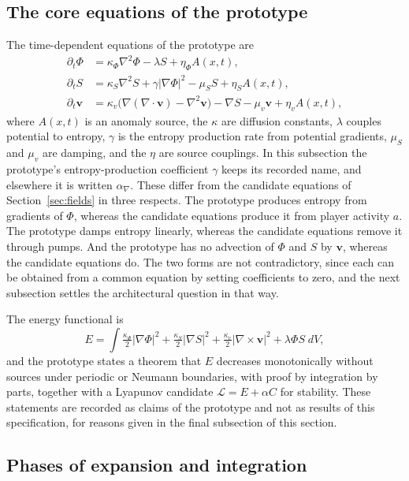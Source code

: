 \documentclass[11pt]{article}
\begin{document}
\subsection{The core equations of the prototype}

The time-dependent equations of the prototype are
\begin{align*}
\partial_t \Phi &= \kappa_\Phi \nabla^2 \Phi - \lambda S + \eta_\Phi A(x,t),\\
\partial_t S &= \kappa_S \nabla^2 S + \gamma |\nabla\Phi|^2 - \mu_S S + \eta_S A(x,t),\\
\partial_t \mathbf{v} &= \kappa_v\big(\nabla(\nabla\!\cdot\mathbf{v}) - \nabla^2\mathbf{v}\big) - \nabla S - \mu_v \mathbf{v} + \eta_v A(x,t),
\end{align*}
where $A(x,t)$ is an anomaly source, the $\kappa$ are diffusion constants, $\lambda$ couples potential to entropy, $\gamma$ is the entropy production rate from potential gradients, $\mu_S$ and $\mu_v$ are damping, and the $\eta$ are source couplings. In this subsection the prototype's entropy-production coefficient $\gamma$ keeps its recorded name, and elsewhere it is written $\alpha_\nabla$. These differ from the candidate equations of Section~\ref{sec:fields} in three respects. The prototype produces entropy from gradients of $\Phi$, whereas the candidate equations produce it from player activity $a$. The prototype damps entropy linearly, whereas the candidate equations remove it through pumps. And the prototype has no advection of $\Phi$ and $S$ by $\mathbf{v}$, whereas the candidate equations do. The two forms are not contradictory, since each can be obtained from a common equation by setting coefficients to zero, and the next subsection settles the architectural question in that way.

The energy functional is
\[
E = \int \tfrac{\kappa_\Phi}{2}|\nabla\Phi|^2 + \tfrac{\kappa_S}{2}|\nabla S|^2 + \tfrac{\kappa_v}{2}|\nabla\times\mathbf{v}|^2 + \lambda\Phi S \; dV,
\]
and the prototype states a theorem that $E$ decreases monotonically without sources under periodic or Neumann boundaries, with proof by integration by parts, together with a Lyapunov candidate $\mathcal{L}=E+\alpha C$ for stability. These statements are recorded as claims of the prototype and not as results of this specification, for reasons given in the final subsection of this section.

\subsection{Phases of expansion and integration}
\end{document}
